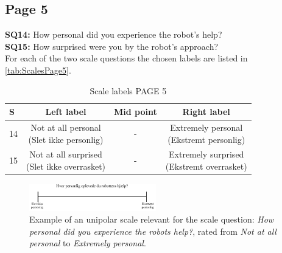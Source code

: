 \subsection{Page 5}
\noindent
\textbf{SQ14:} How personal did you experience the robot's help?\\%
\textbf{SQ15:} How surprised were you by the robot's approach?\\%
For each of the two scale questions the chosen labels are listed in \autoref{tab:ScalesPage5}. 
%
\begin{table}[H]
	\centering
\caption{Scale labels PAGE 5}
	\label{tab:ScalesPage5} 
	\begin{tabular}{l|c|c|c}
		S     & Left label & Mid point & Right label \\\hline
		14   & \makecell{Not at all personal\\(Slet ikke personlig)}  & - & \makecell{Extremely personal\\(Ekstremt personlig)}        \\\hline
		15   & \makecell{Not at all surprised\\(Slet ikke overrasket)} & - & \makecell{Extremely surprised \\(Ekstremt overrasket)}               
	\end{tabular}        
\end{table}
\noindent
%
\begin{figure}[H]
\centering
\includegraphics[width = 0.49\textwidth]{Figure/TilpassetPersonligHjaelp}
\setlength{} 
\caption{Example of an unipolar scale relevant for the scale question: \textit{How personal did you experience the robots help?}, rated from \textit{Not at all personal} to \textit{Extremely personal}.}
\label{fig:TilpassetPersonligHjaelp}
\end{figure}
\noindent
% 
